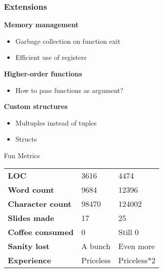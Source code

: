 \documentclass{beamer}
\begin{document}
\begin{frame}
\frametitle{Extensions}
\textbf{Memory management}
\begin{itemize}
\item Garbage collection on function exit
\item Efficient use of registers
\end{itemize}
\textbf{Higher-order functions}
\begin{itemize}
\item How to pass functions as argument?
\end{itemize}
\textbf{Custom structures}
\begin{itemize}
\item Multuples instead of tuples
\item Structs
\end{itemize}
\end{frame}

\begin{frame}
\begin{block}{Fun Metrics}
\begin{tabular}{l || l | l}
\textbf{LOC} & 3616 & 4474\\
\textbf{Word count} & 9684 & 12396\\
\textbf{Character count} & 98470 & 124002 \\
\textbf{Slides made} & 17 & 25\\
\textbf{Coffee consumed} & 0 & Still 0\\
\textbf{Sanity lost} & A bunch & Even more \\
\textbf{Experience} & Priceless & Priceless*2
\end{tabular}
\end{block}
\end{frame}

\begin{frame}
\end{frame}
\end{document}
